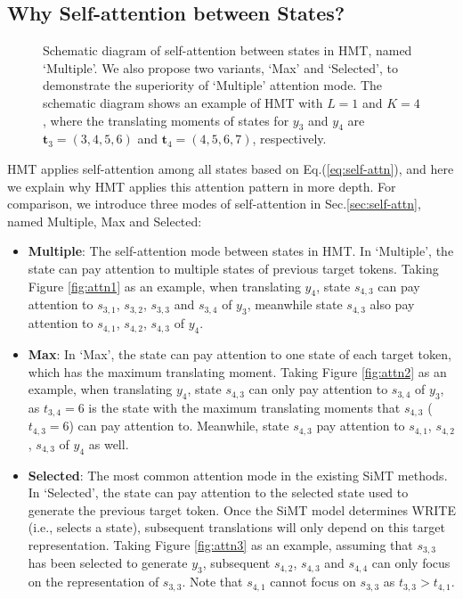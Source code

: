 \documentclass{article} %
\begin{document}
\subsection{Why Self-attention between States?}
\label{app:attn}

\begin{figure}[h]
\centering
{}\quad
{}\quad
{}
\vspace{-0.1in}
\caption{Schematic diagram of self-attention between states in HMT, named `Multiple'. We also propose two variants, `Max' and `Selected', to demonstrate the superiority of `Multiple' attention mode. The schematic diagram shows an example of HMT with $L=1$ and $K=4$, where the translating moments of states for $y_{3}$ and $y_{4}$ are $\mathbf{t}_{3}=(3,4,5,6)$ and $\mathbf{t}_{4}=(4,5,6,7)$, respectively.}
\label{fig:attn}
\end{figure}

HMT applies self-attention among all states based on Eq.(\ref{eq:self-attn}), and here we explain why HMT applies this attention pattern in more depth. For comparison, we introduce three modes of self-attention in Sec.\ref{sec:self-attn}, named Multiple, Max and Selected:
\begin{itemize}
    \item \textbf{Multiple}: The self-attention mode between states in HMT. In `Multiple', the state can pay attention to multiple states of previous target tokens. Taking Figure \ref{fig:attn1} as an example, when translating $y_{4}$, state $s_{4,3}$ can pay attention to $s_{3,1}$, $s_{3,2}$, $s_{3,3}$ and $s_{3,4}$ of $y_{3}$, meanwhile state $s_{4,3}$ also pay attention to $s_{4,1}$, $s_{4,2}$, $s_{4,3}$ of $y_{4}$.
    \item \textbf{Max}: In ‘Max’, the state can pay attention to one state of each target token, which has the maximum translating moment. Taking Figure \ref{fig:attn2} as an example, when translating $y_{4}$, state $s_{4,3}$ can only pay attention to $s_{3,4}$ of $y_{3}$, as $t_{3,4}=6$ is the state with the maximum translating moments that $s_{4,3}$ ($t_{4,3}=6$) can pay attention to. Meanwhile, state $s_{4,3}$ pay attention to $s_{4,1}$, $s_{4,2}$, $s_{4,3}$ of $y_{4}$ as well.
    \item \textbf{Selected}: The most common attention mode in the existing SiMT methods. In `Selected', the state can pay attention to the selected state used to generate the previous target token. Once the SiMT model determines WRITE (i.e., selects a state), subsequent translations will only depend on this target representation. Taking Figure \ref{fig:attn3} as an example, assuming that $s_{3,3}$ has been selected to generate $y_{3}$, subsequent $s_{4,2}$, $s_{4,3}$ and $s_{4,4}$ can only focus on the representation of $s_{3,3}$. Note that $s_{4,1}$ cannot focus on $s_{3,3}$ as $t_{3,3}>t_{4,1}$.
\end{itemize}
\end{document}
